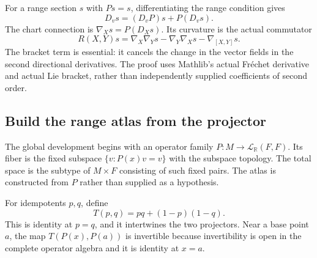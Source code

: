 For a range section $s$ with $Ps=s$, differentiating the range condition gives
\[
D_vs=(D_vP)s+P(D_vs).
\]
The chart connection is $\nabla_Xs=P(D_Xs)$. Its curvature is the actual commutator
\[
R(X,Y)s=\nabla_X\nabla_Ys-\nabla_Y\nabla_Xs-\nabla_{[X,Y]}s.
\]
The bracket term is essential: it cancels the change in the vector fields in the second directional derivatives. The proof uses Mathlib's actual Fréchet derivative and actual Lie bracket, rather than independently supplied coefficients of second order.




\subsection{Build the range atlas from the projector}
The global development begins with an operator family $P:M\to\mathcal L_{\mathbb R}(F,F)$. Its fiber is the fixed subspace $\{v:P(x)v=v\}$ with the subspace topology. The total space is the subtype of $M\times F$ consisting of such fixed pairs. The atlas is constructed from $P$ rather than supplied as a hypothesis.

For idempotents $p,q$, define
\[
T(p,q)=pq+(1-p)(1-q).
\]
This is identity at $p=q$, and it intertwines the two projectors. Near a base point $a$, the map $T(P(x),P(a))$ is invertible because invertibility is open in the complete operator algebra and it is identity at $x=a$.


